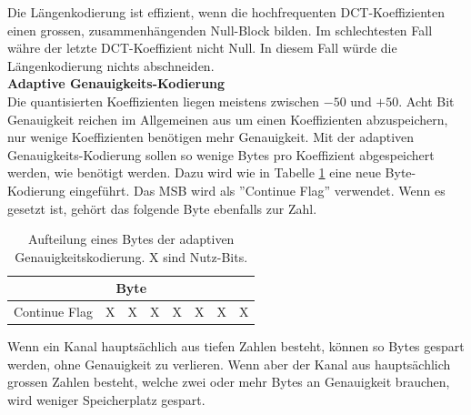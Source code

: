 Die Längenkodierung ist effizient, wenn die hochfrequenten DCT-Koeffizienten einen grossen, zusammenhängenden Null-Block bilden. Im schlechtesten Fall währe der letzte DCT-Koeffizient nicht Null. In diesem Fall würde die Längenkodierung nichts abschneiden.\\

\textbf{Adaptive Genauigkeits-Kodierung}\\
Die quantisierten Koeffizienten liegen meistens zwischen $-50$ und $+50$. Acht Bit Genauigkeit reichen im Allgemeinen aus um einen Koeffizienten abzuspeichern, nur wenige Koeffizienten benötigen mehr Genauigkeit. Mit der adaptiven Genauigkeits-Kodierung sollen so wenige Bytes pro Koeffizient abgespeichert werden, wie benötigt werden. Dazu wird wie in Tabelle \ref{konzept:loesung1:entropie:adaptive} eine neue Byte-Kodierung eingeführt. Das MSB wird als ''Continue Flag'' verwendet. Wenn es gesetzt ist, gehört das folgende Byte ebenfalls zur Zahl.\\
\begin{table}[!htbp]
	\center
	\begin{tabular}{|c|c|c|c||c|c|c|c|}
	\hline
	\multicolumn{8}{|c|}{Byte}\\\hline
	Continue Flag & X & X & X & X & X & X & X \\\hline
	\end{tabular}
	\caption{Aufteilung eines Bytes der adaptiven Genauigkeitskodierung. X sind Nutz-Bits.}
	\label{konzept:loesung1:entropie:adaptive}
\end{table}
Wenn ein Kanal hauptsächlich aus tiefen Zahlen besteht, können so Bytes gespart werden, ohne Genauigkeit zu verlieren. Wenn aber der Kanal aus hauptsächlich grossen Zahlen besteht, welche zwei oder mehr Bytes an Genauigkeit brauchen, wird weniger Speicherplatz gespart.